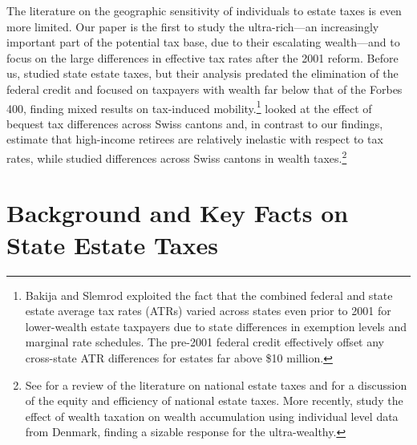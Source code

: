 \documentclass[12pt]{article}
\begin{document}
The literature on the geographic sensitivity of individuals to estate taxes is even more limited. Our paper is the first to study the ultra-rich---an increasingly important part of the potential tax base, due to their escalating wealth---and to focus on the large differences in effective tax rates after the 2001 reform. 
Before us, \cite{bakija/slemrod:2004} studied state estate taxes, but their analysis predated the elimination of the federal credit and focused on taxpayers with wealth far below that of the Forbes 400, finding mixed results on tax-induced mobility.\footnote{Bakija and Slemrod exploited the fact that the combined federal and state estate average tax rates (ATRs) varied across states even prior to 2001 for lower-wealth estate taxpayers due to state differences in exemption levels and marginal rate schedules. The pre-2001 federal credit effectively offset any cross-state ATR differences for estates far above \$10 million.} \cite{brulhart2014alleged} looked at the effect of bequest tax differences across Swiss cantons and, in contrast to our findings, estimate that high-income retirees are relatively inelastic with respect to tax rates, while \cite{brulhart_etal2017} studied differences across Swiss cantons in wealth taxes.\footnote{See \cite{wo3} for a review of the literature on national estate taxes and \cite{gale} for a discussion of the equity and efficiency of national estate taxes. More recently, \cite{jakobsen2018wealth} study the effect of wealth taxation on wealth accumulation using individual level data from Denmark, finding a sizable response for the ultra-wealthy.} 



 








%


\section{Background and Key Facts on State Estate Taxes}
\end{document}
